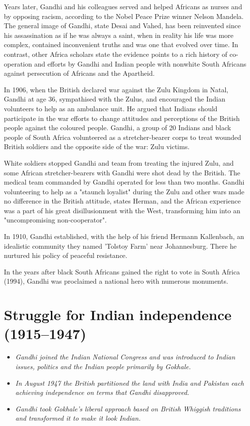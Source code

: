 Years later, Gandhi and his colleagues served and helped Africans as
nurses and by opposing racism, according to the Nobel Peace Prize winner
Nelson Mandela. The general image of Gandhi, state Desai and Vahed, has
been reinvented since his assassination as if he was always a saint,
when in reality his life was more complex, contained inconvenient truths
and was one that evolved over time. In contrast, other Africa scholars
state the evidence points to a rich history of co-operation and efforts
by Gandhi and Indian people with nonwhite South Africans against
persecution of Africans and the Apartheid.

In 1906, when the British declared war against the Zulu Kingdom in
Natal, Gandhi at age 36, sympathised with the Zulus, and encouraged the
Indian volunteers to help as an ambulance unit. He argued that Indians
should participate in the war efforts to change attitudes and
perceptions of the British people against the coloured people. Gandhi, a
group of 20 Indians and black people of South Africa volunteered as a
stretcher-bearer corps to treat wounded British soldiers and the
opposite side of the war: Zulu victims.

White soldiers stopped Gandhi and team from treating the injured Zulu,
and some African stretcher-bearers with Gandhi were shot dead by the
British. The medical team commanded by Gandhi operated for less than two
months. Gandhi volunteering to help as a "staunch loyalist" during the
Zulu and other wars made no difference in the British attitude, states
Herman, and the African experience was a part of his great
disillusionment with the West, transforming him into an "uncompromising
non-cooperator".

In 1910, Gandhi established, with the help of his friend Hermann
Kallenbach, an idealistic community they named 'Tolstoy Farm' near
Johannesburg. There he nurtured his policy of peaceful resistance.

In the years after black South Africans gained the right to vote in
South Africa (1994), Gandhi was proclaimed a national hero with numerous
monuments.

\section{Struggle for Indian independence
(1915--1947)}\label{struggle-for-indian-independence-19151947}

\begin{itemize}
\item
  \emph{Gandhi joined the Indian National Congress and was introduced to
  Indian issues, politics and the Indian people primarily by Gokhale.}
\item
  \emph{In August 1947 the British partitioned the land with India and
  Pakistan each achieving independence on terms that Gandhi
  disapproved.}
\item
  \emph{Gandhi took Gokhale's liberal approach based on British Whiggish
  traditions and transformed it to make it look Indian.}
\end{itemize}

